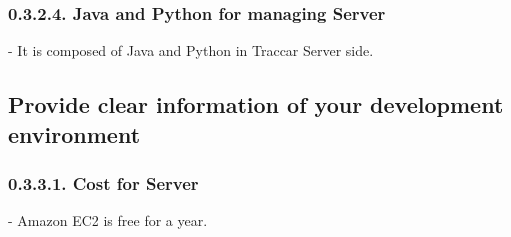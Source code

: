 \documentclass[10pt,a4paper,twocolumn]{report}
\begin{document}
		\subsubsection{0.3.2.4. Java and Python for managing Server}
		- It is composed of Java and Python in Traccar Server side. \\
		
	\subsection{Provide clear information of your development environment}	
		\subsubsection{0.3.3.1. Cost for Server}
		- Amazon EC2 is free for a year. \\
		
\end{document}
